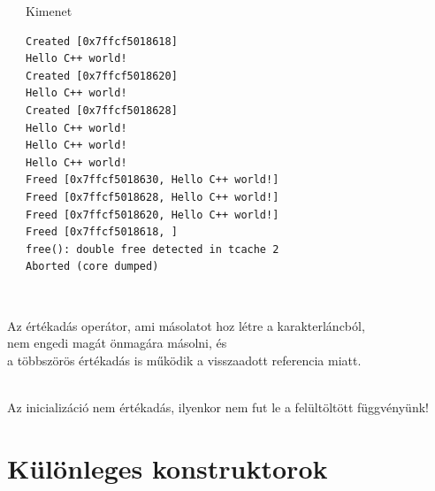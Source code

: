 \documentclass[usenames,dvipsnames,aspectratio=169]{beamer}
\begin{document}
\begin{frame}[fragile]
    \begin{columns}[T]
            \begin{exampleblock}{}
                \vspace{-.2cm}
                \fontsize{7}{8} \selectfont
                
                \vspace{-.2cm}
            \end{exampleblock}
            \begin{block}{Kimenet}
                \vspace{-.4cm}
                \footnotesize
                \begin{verbatim}
Created [0x7ffcf5018618]
Hello C++ world!
Created [0x7ffcf5018620]
Hello C++ world!
Created [0x7ffcf5018628]
Hello C++ world!
Hello C++ world!
Hello C++ world!
Freed [0x7ffcf5018630, Hello C++ world!]
Freed [0x7ffcf5018628, Hello C++ world!]
Freed [0x7ffcf5018620, Hello C++ world!]
Freed [0x7ffcf5018618, ]
free(): double free detected in tcache 2
Aborted (core dumped)               
\end{verbatim}             
                \vspace{-.4cm}
            \end{block}
    \end{columns}
\end{frame}

\begin{frame}
    \begin{description}[m]
        \item[Ami jól működik:] \hfill \\ Az értékadás operátor, ami másolatot hoz létre a karakterláncból, \\nem engedi magát önmagára másolni, és \\a többszörös értékadás is működik a visszaadott referencia miatt.
        \item[Ami hibás:] \hfill \\ Az inicializáció nem értékadás, ilyenkor nem fut le a felültöltött függvényünk!
    \end{description}
\end{frame}

\section{Különleges konstruktorok}
\end{document}
